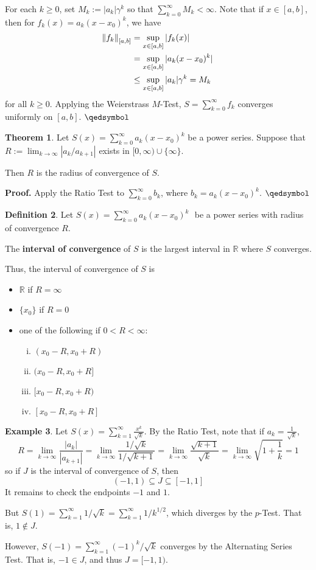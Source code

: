 \documentclass[11pt]{article}
\theoremstyle{definition}
\newtheorem{thm}{Theorem}[section]
\newtheorem{defn}[thm]{Definition}
\newtheorem{exmp}[thm]{Example}
\newcommand{\mbR}{\ensuremath{\mathbb{R}}}
\newcommand{\powerseries}{\ensuremath{S(x) = \sum_{k=0}^\infty a_k (x - x_0)^k \text{ }}}
\begin{document}
For each $k \geq 0$, set $M_k := |a_k| \gamma^k$ so that $\sum_{k=0}^\infty M_k < \infty$. Note that if $x \in [a, b]$, then for $f_k(x) = a_k(x - x_0)^k$, we have
\begin{align*}
\norm{f_k}_{[a, b]} & = \sup_{x\in[a, b]} |f_k(x)| \\
& = \sup_{x\in[a, b]} |a_k(x - x_0)^k| \\
& \leq \sup_{x\in[a, b]} |a_k|\gamma^k = M_k
\end{align*}
for all $k \geq 0$. Applying the Weierstrass $M$-Test, $S = \sum_{k=0}^\infty f_k$ converges uniformly on $[a, b]$. $\qedsymbol$

\begin{thm}
Let $S(x) = \sum_{k=0}^\infty a_k (x - x_0)^k$ be a power series. Suppose that $R := \lim_{k\to\infty} |a_k / a_{k+1}|$ exists in $[0, \infty) \cup \{\infty\}$.

Then $R$ is the radius of convergence of $S$.
\end{thm}
\textbf{Proof.} Apply the Ratio Test to $\sum_{k=0}^\infty b_k$, where $b_k = a_k(x - x_0)^k$. $\qedsymbol$

\begin{defn}
Let \powerseries be a power series with radius of convergence $R$.

The \textbf{interval of convergence} of $S$ is the largest interval in $\mbR$ where $S$ converges.

Thus, the interval of convergence of $S$ is
\begin{itemize} \vspace{-0.2cm}
\item $\mbR$ if $R = \infty$
\item $\{x_0\}$ if $R = 0$
\item one of the following if $0 < R < \infty$:
\begin{enumerate}[(i)]
\item $(x_0 - R, x_0 + R)$
\item $(x_0 - R, x_0 + R]$
\item $[x_0 - R, x_0 + R)$
\item $[x_0 - R, x_0 + R]$
\end{enumerate}
\end{itemize}
\end{defn}

\begin{exmp}
Let $S(x) = \sum_{k=1}^\infty \frac{x^k}{\sqrt{k}}$. By the Ratio Test, note that if $a_k = \frac{1}{\sqrt{k}}$,
$$R = \lim_{k\to\infty} \frac{|a_k|}{|a_{k+1}|} = \lim_{k\to\infty} \frac{1/\sqrt{k}}{1/\sqrt{k+1}} = \lim_{k\to\infty} \frac{\sqrt{k+1}}{\sqrt{k}} = \lim_{k\to\infty} \sqrt{1+\frac1k} = 1$$
so if $J$ is the interval of convergence of $S$, then
$$(-1, 1) \subseteq J \subseteq [-1, 1]$$
It remains to check the endpoints $-1$ and $1$.

But $S(1) = \sum_{k=1}^\infty 1/\sqrt{k} = \sum_{k=1}^\infty 1/k^{1/2}$, which diverges by the $p$-Test. That is, $1 \notin J$.

However, $S(-1) = \sum_{k=1}^\infty (-1)^k / \sqrt{k}$ converges by the Alternating Series Test. That is, $-1 \in J$, and thus $J = [-1, 1)$.
\end{exmp}
\end{document}
